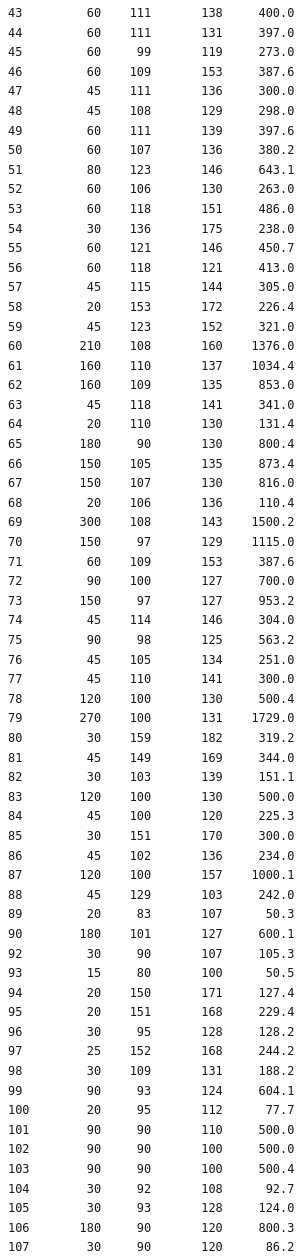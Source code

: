 \begin{code}
\begin{verbatim}
43         60    111       138     400.0
44         60    111       131     397.0
45         60     99       119     273.0
46         60    109       153     387.6
47         45    111       136     300.0
48         45    108       129     298.0
49         60    111       139     397.6
50         60    107       136     380.2
51         80    123       146     643.1
52         60    106       130     263.0
53         60    118       151     486.0
54         30    136       175     238.0
55         60    121       146     450.7
56         60    118       121     413.0
57         45    115       144     305.0
58         20    153       172     226.4
59         45    123       152     321.0
60        210    108       160    1376.0
61        160    110       137    1034.4
62        160    109       135     853.0
63         45    118       141     341.0
64         20    110       130     131.4
65        180     90       130     800.4
66        150    105       135     873.4
67        150    107       130     816.0
68         20    106       136     110.4
69        300    108       143    1500.2
70        150     97       129    1115.0
71         60    109       153     387.6
72         90    100       127     700.0
73        150     97       127     953.2
74         45    114       146     304.0
75         90     98       125     563.2
76         45    105       134     251.0
77         45    110       141     300.0
78        120    100       130     500.4
79        270    100       131    1729.0
80         30    159       182     319.2
81         45    149       169     344.0
82         30    103       139     151.1
83        120    100       130     500.0
84         45    100       120     225.3
85         30    151       170     300.0
86         45    102       136     234.0
87        120    100       157    1000.1
88         45    129       103     242.0
89         20     83       107      50.3
90        180    101       127     600.1
92         30     90       107     105.3
93         15     80       100      50.5
94         20    150       171     127.4
95         20    151       168     229.4
96         30     95       128     128.2
97         25    152       168     244.2
98         30    109       131     188.2
99         90     93       124     604.1
100        20     95       112      77.7
101        90     90       110     500.0
102        90     90       100     500.0
103        90     90       100     500.4
104        30     92       108      92.7
105        30     93       128     124.0
106       180     90       120     800.3
107        30     90       120      86.2

\end{verbatim}
\end{code}

